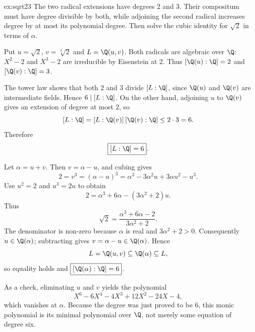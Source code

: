 \begin{solution}{ex:sqrt23}
\idea The two radical extensions have degrees $2$ and $3$. Their compositum must have degree divisible by both, while adjoining the second radical increases degree by at most its polynomial degree. Then solve the cubic identity for $\sqrt2$ in terms of $\alpha$.

\writeup Put $u=\sqrt2$, $v=\sqrt[3]{2}$ and $L=\Q(u,v)$. Both radicals are algebraic over $\Q$: $X^2-2$ and $X^3-2$ are irreducible by Eisenstein at $2$. Thus $[\Q(u):\Q]=2$ and $[\Q(v):\Q]=3$.

The tower law shows that both $2$ and $3$ divide $[L:\Q]$, since $\Q(u)$ and $\Q(v)$ are intermediate fields. Hence $6\mid[L:\Q]$. On the other hand, adjoining $u$ to $\Q(v)$ gives an extension of degree at most $2$, so
\[
[L:\Q]=[L:\Q(v)]\,[\Q(v):\Q]\le2\cdot3=6.
\]
Therefore
\[
\boxed{[L:\Q]=6}.
\]

Let $\alpha=u+v$. Then $v=\alpha-u$, and cubing gives
\[
2=v^3=(\alpha-u)^3
=\alpha^3-3\alpha^2u+3\alpha u^2-u^3.
\]
Use $u^2=2$ and $u^3=2u$ to obtain
\[
2=\alpha^3+6\alpha-(3\alpha^2+2)u.
\]
Thus
\[
\boxed{\sqrt2=\frac{\alpha^3+6\alpha-2}{3\alpha^2+2}}.
\]
The denominator is non-zero because $\alpha$ is real and $3\alpha^2+2>0$. Consequently $u\in\Q(\alpha)$; subtracting gives $v=\alpha-u\in\Q(\alpha)$. Hence
\[
L=\Q(u,v)\subseteq\Q(\alpha)\subseteq L,
\]
so equality holds and $\boxed{[\Q(\alpha):\Q]=6}$.

As a check, eliminating $u$ and $v$ yields the polynomial
\[
X^6-6X^4-4X^3+12X^2-24X-4,
\]
which vanishes at $\alpha$. Because the degree was just proved to be $6$, this monic polynomial is its minimal polynomial over $\Q$, not merely some equation of degree six.
\end{solution}

